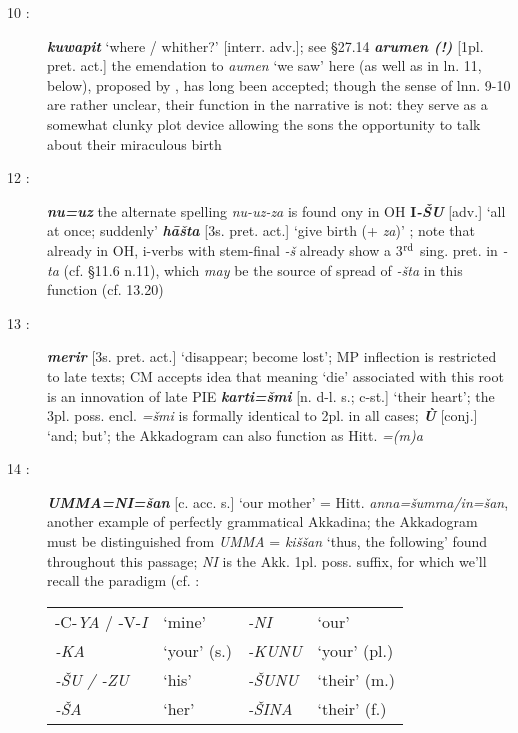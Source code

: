 \documentclass[10pt]{article}
\newcommand{\supersc}[1]{$^{\textrm{\scriptsize{#1}}}$}  	%
\newcommand{\bit}[1]{\textbf{\textit{#1}}}				%
\newcommand{\p}[1]{{\tiny[{#1}]}}					%
\newcommand{\hith}{\textsubwedge{h}}
\renewcommand{\.}[1]{\textsubdot{#1}}
\begin{document}
\begin{description}
\item[10 :] \bit{kuwapit} `where / whither?' \p{interr. adv.}; see  \S27.14 \bit{arumen (!)} \p{1pl. pret. act.} the emendation to \textit{aumen} `we saw' here (as well as in ln. 11, below), proposed by \citet[185]{eichner1974chronik}, has long been accepted; though the sense of lnn. 9-10 are rather unclear, their function in the narrative is not: they serve as a somewhat clunky plot device allowing the sons the opportunity to talk about their miraculous birth

\item[12 :] \bit{nu=uz} the alternate spelling \textit{nu-uz-za} is found ony in OH \textbf{I}\bit{-\v{S}U} \p{adv.} `all at once; suddenly' \bit{h\=a\v{s}ta} \p{3s. pret. act.} `give birth (+ \textit{za})' ; note that already in OH, {\hith}i-verbs with stem-final \textit{-\v{s}} already show a 3\supersc{rd} sing. pret. in \textit{-ta} (cf.  \S11.6 n.11), which \textit{may} be the source of spread of \textit{-\v{s}ta} in this function (cf. 13.20)

\item[13 :] \bit{merir} \p{3s. pret. act.} `disappear; become lost'; MP inflection is restricted to late texts; CM accepts idea that meaning `die' associated with this root is an innovation of late PIE \bit{karti=\v{s}mi} \p{n. d-l. s.; c-st.} `their heart'; the 3pl. poss. encl. \textit{=\v{s}mi} is formally identical to 2pl. in all cases; \bit{\`U} \p{conj.} `and; but'; the Akkadogram can also function as Hitt. \textit{=(m)a}

\item[14 :] \bit{UMMA=NI=\v{s}an} \p{c. acc. s.} `our mother' = Hitt. \textit{anna=\v{s}umma/in=\v{s}an}, another example of perfectly grammatical Akkadina; the Akkadogram must be distinguished from \textit{UMMA} = \textit{ki\v{s}\v{s}an} `thus, the following' found throughout this passage; \textit{NI} is the Akk. 1pl. poss. suffix, for which we'll recall the paradigm (cf. \citet[78]{vandenhout2011elements}: \\

\begin{tabular}{|ll|ll|} \hline
-C-\textit{YA} / -V-\textit{I} & `mine' & \textit{-NI} & `our' \\
\textit{-KA} & `your' (s.) & \textit{-KUNU} & `your' (pl.) \\
\textit{-\v{S}U / -ZU} & `his' & \textit{-\v{S}UNU} & `their' (m.) \\
\textit{-\v{S}A} & `her' & \textit{-\v{S}INA} & `their' (f.) \\ \hline
\end{tabular}


\end{description}
\end{document}
